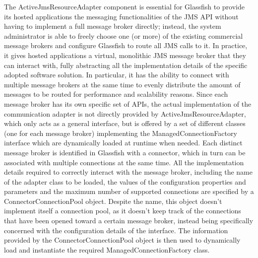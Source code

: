 The ActiveJmsResourceAdapter component is essential for Glassfish to provide its hosted applications the messaging functionalities of the JMS API without having to implement a full message broker directly; instead, the system administrator is able to freely choose one (or more) of the existing commercial message brokers and configure Glassfish to route all JMS calls to it. In practice, it gives hosted applications a virtual, monolithic JMS message broker that they can interact with, fully abstracting all the implementation details of the specific adopted software solution.
In particular, it has the ability to connect with multiple message brokers at the same time to evenly distribute the amount of messages to be routed for performance and scalability reasons. Since each message broker has its own specific set of APIs, the actual implementation of the communication adapter is not directly provided by ActiveJmsResourceAdapter, which only acts as a general interface, but is offered by a set of different classes (one for each message broker) implementing the ManagedConnectionFactory interface which are dynamically loaded at runtime when needed. 
Each distinct message broker is identified in Glassfish with a connector, which in turn can be associated with multiple connections at the same time. All the implementation details required to correctly interact with the message broker, including the name of the adapter class to be loaded, the values of the configuration properties and parameters and the maximum number of supported connections are specified by a ConnectorConnectionPool object. Despite the name, this object doesn't implement itself a connection pool, as it doesn't keep track of the connections that have been opened toward a certain message broker, instead being specifically concerned with the configuration details of the interface. The information provided by the ConnectorConnectionPool object is then used to dynamically load and instantiate the required ManagedConnectionFactory class.

